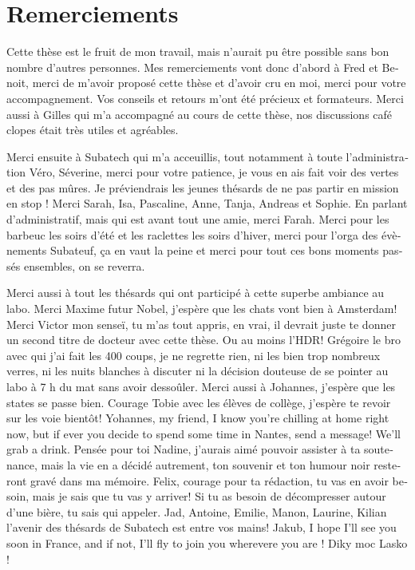 \documentclass[../main.tex]{subfiles}
\begin{document}
\chapter*{Remerciements}

\begin{otherlanguage}{french}
Cette thèse est le fruit de mon travail, mais n'aurait pu être possible sans bon nombre d'autres personnes. Mes remerciements vont donc d'abord à Fred et Benoit, merci de m'avoir proposé cette thèse et d'avoir cru en moi, merci pour votre accompagnement. Vos conseils et retours m'ont été précieux et formateurs. Merci aussi à Gilles qui m'a accompagné au cours de cette thèse, nos discussions café clopes était très utiles et agréables.

Merci ensuite à Subatech qui m'a acceuillis, tout notamment à toute l'administration Véro, Séverine, merci pour votre patience, je vous en ais fait voir des vertes et des pas mûres. Je préviendrais les jeunes thésards de ne pas partir en mission en stop ! Merci Sarah, Isa, Pascaline, Anne, Tanja, Andreas et Sophie. En parlant d'administratif, mais qui est avant tout une amie, merci Farah. Merci pour les barbeuc les soirs d'été et les raclettes les soirs d'hiver, merci pour l'orga des évènements Subateuf, ça en vaut la peine et merci pour tout ces bons moments passés ensembles, on se reverra.

Merci aussi à tout les thésards qui ont participé à cette superbe ambiance au labo. Merci Maxime futur Nobel, j'espère que les chats vont bien à Amsterdam! Merci Victor mon senseï, tu m'as tout appris, en vrai, il devrait juste te donner un second titre de docteur avec cette thèse. Ou au moins l'HDR!
Grégoire le bro avec qui j'ai fait les 400 coups, je ne regrette rien, ni les bien trop nombreux verres, ni les nuits blanches à discuter ni la décision douteuse de se pointer au labo à 7 h du mat sans avoir dessoûler. Merci aussi à Johannes, j'espère que les states se passe bien.
Courage Tobie avec les élèves de collège, j'espère te revoir sur les voie bientôt! Yohannes, my friend, I know you're chilling at home right now, but if ever you decide to spend some time in Nantes, send a message! We'll grab a drink.
Pensée pour toi Nadine, j'aurais aimé pouvoir assister à ta soutenance, mais la vie en a décidé autrement, ton souvenir et ton humour noir resteront gravé dans ma mémoire.
Felix, courage pour ta rédaction, tu vas en avoir besoin, mais je sais que tu vas y arriver! Si tu as besoin de décompresser autour d'une bière, tu sais qui appeler.
Jad, Antoine, Emilie, Manon, Laurine, Kilian l'avenir des thésards de Subatech est entre vos mains! Jakub, I hope I'll see you soon in France, and if not, I'll fly to join you wherevere you are ! Diky moc Lasko !


\end{otherlanguage}
\end{document}
